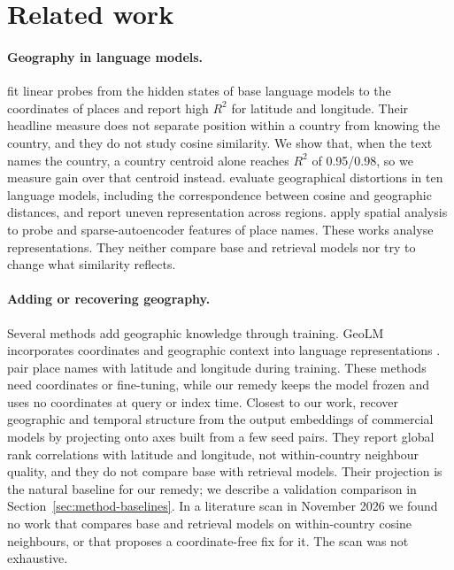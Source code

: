 \section{Related work}
\label{sec:related}

\paragraph{Geography in language models.}
\citet{gurnee2024space} fit linear probes from the hidden states of base language models to the coordinates of places and report high $R^2$ for latitude and longitude. Their headline measure does not separate position within a country from knowing the country, and they do not study cosine similarity. We show that, when the text names the country, a country centroid alone reaches $R^2$ of 0.95/0.98, so we measure gain over that centroid instead. \citet{decoupes2025distortions} evaluate geographical distortions in ten language models, including the correspondence between cosine and geographic distances, and report uneven representation across regions. \citet{desabbata2025geospatial} apply spatial analysis to probe and sparse-autoencoder features of place names. These works analyse representations. They neither compare base and retrieval models nor try to change what similarity reflects.

\paragraph{Adding or recovering geography.}
Several methods add geographic knowledge through training. GeoLM incorporates coordinates and geographic context into language representations \citep{li2023geolm}. \citet{srinivasagan2026location} pair place names with latitude and longitude during training. These methods need coordinates or fine-tuning, while our remedy keeps the model frozen and uses no coordinates at query or index time. Closest to our work, \citet{feuerstein2026recovering} recover geographic and temporal structure from the output embeddings of commercial models by projecting onto axes built from a few seed pairs. They report global rank correlations with latitude and longitude, not within-country neighbour quality, and they do not compare base with retrieval models. Their projection is the natural baseline for our remedy; we describe a validation comparison in Section~\ref{sec:method-baselines}. In a literature scan in November 2026 we found no work that compares base and retrieval models on within-country cosine neighbours, or that proposes a coordinate-free fix for it. The scan was not exhaustive.


